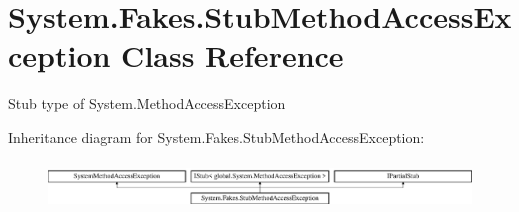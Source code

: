 \hypertarget{class_system_1_1_fakes_1_1_stub_method_access_exception}{\section{System.\-Fakes.\-Stub\-Method\-Access\-Exception Class Reference}
\label{class_system_1_1_fakes_1_1_stub_method_access_exception}
}


Stub type of System.\-Method\-Access\-Exception 


Inheritance diagram for System.\-Fakes.\-Stub\-Method\-Access\-Exception\-:\begin{figure}[H]
\begin{center}
\leavevmode
\includegraphics[height=1.274175cm]{class_system_1_1_fakes_1_1_stub_method_access_exception}
\end{center}
\end{figure}
